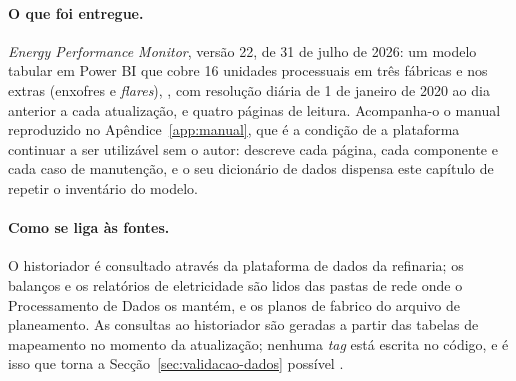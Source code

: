 \paragraph{O que foi entregue.} \emph{Energy Performance Monitor}, versão
22, de 31 de julho de 2026: um modelo tabular em Power
BI que cobre 16
unidades processuais em três fábricas e nos extras (enxofres e
\emph{flares}), , com resolução diária de 1 de janeiro de
2020 ao dia anterior a cada atualização, e quatro páginas de leitura.
 Acompanha-o o manual reproduzido no
Apêndice~\ref{app:manual}, que é a condição de a plataforma continuar a ser
utilizável sem o autor: descreve cada página, cada componente e cada caso de
manutenção, e o seu dicionário de dados dispensa este capítulo de repetir o
inventário do modelo.

\paragraph{Como se liga às fontes.} O historiador é consultado através da
plataforma de dados da refinaria; os balanços e os relatórios de
eletricidade são lidos das pastas de rede onde o Processamento de Dados os
mantém, e os planos de fabrico do arquivo de planeamento. As consultas ao
historiador são geradas a partir das tabelas de mapeamento no momento da
atualização; nenhuma \emph{tag} está escrita no código, e é isso que torna
a Secção~\ref{sec:validacao-dados} possível .

